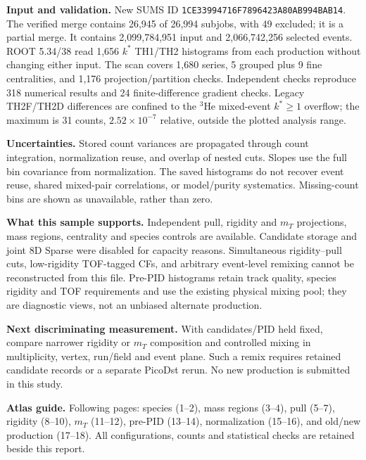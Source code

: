 \documentclass[10pt,a4paper]{article}
\begin{document}
\textbf{Input and validation.} New SUMS ID \texttt{1CE33994716F7896423A80AB994BAB14}.
The verified merge contains 26,945 of 26,994 subjobs, with 49 excluded; it is a partial merge.
It contains 2,099,784,951 input and 2,066,742,256 selected events.
ROOT 5.34/38 read 1,656 $k^*$ TH1/TH2 histograms from each production without changing either input.
The scan covers 1,680 series, 5 grouped plus 9 fine centralities, and 1,176 projection/partition checks.
Independent checks reproduce 318 numerical results and 24 finite-difference gradient checks.
Legacy TH2F/TH2D differences are confined to the $^3$He mixed-event $k^*\geq1$ overflow;
the maximum is 31 counts, $2.52\times10^{-7}$ relative, outside the plotted analysis range.

\textbf{Uncertainties.} Stored count variances are propagated through count integration, normalization reuse,
and overlap of nested cuts. Slopes use the full bin covariance from normalization.
The saved histograms do not recover event reuse, shared mixed-pair correlations, or model/purity systematics.
Missing-count bins are shown as unavailable, rather than zero.

\textbf{What this sample supports.} Independent pull, rigidity and $m_T$ projections, mass regions,
centrality and species controls are available.
Candidate storage and joint 8D Sparse were disabled for capacity reasons.
Simultaneous rigidity--pull cuts, low-rigidity TOF-tagged CFs, and arbitrary event-level remixing cannot be reconstructed from this file.
Pre-PID histograms retain track quality, species rigidity and TOF requirements and use the existing physical mixing pool;
they are diagnostic views, not an unbiased alternate production.

\textbf{Next discriminating measurement.} With candidates/PID held fixed, compare narrower rigidity or $m_T$ composition and
controlled mixing in multiplicity, vertex, run/field and event plane. Such a remix requires retained candidate records or a separate PicoDst rerun.
No new production is submitted in this study.

\textbf{Atlas guide.} Following pages: species (1--2), mass regions (3--4), pull (5--7), rigidity (8--10),
$m_T$ (11--12), pre-PID (13--14), normalization (15--16), and old/new production (17--18).
All configurations, counts and statistical checks are retained beside this report.

\end{document}
